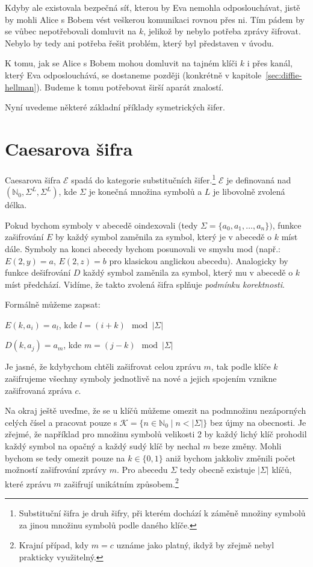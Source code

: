 \documentclass[
  program=infoi,
  biblatex,
  figures=false,
  glossaries,
  index
]{kidiplom}
\begin{document}
    Kdyby ale existovala bezpečná síť, kterou by Eva nemohla
    odposlouchávat, jistě by mohli Alice s Bobem vést veškerou komunikaci rovnou přes ni.
    Tím pádem by se vůbec nepotřebovali domluvit na $k$, jelikož
    by nebylo potřeba zprávy šifrovat. Nebylo by tedy ani potřeba řešit problém, který byl představen v úvodu.

    K tomu, jak se Alice s Bobem mohou domluvit na tajném klíči $k$ i přes kanál, který 
    Eva odposlouchává, se dostaneme později (konkrétně v kapitole~\ref{sec:diffie-hellman}).
    Budeme k tomu potřebovat širší aparát znalostí.

    Nyní uvedeme některé základní příklady symetrických šifer.


\section{Caesarova šifra}

    Caesarova šifra $\mathcal{E}$ spadá do kategorie substitučních šifer.\footnote{Substituční šifra je druh šifry, při kterém dochází k záměně
    množiny symbolů za jinou množinu symbolů podle daného klíče.}
    $\mathcal{E}$ je definovaná nad $(\mathbb{N}_0,\Sigma^L,\Sigma^L)$, kde $\Sigma$
    je konečná množina symbolů a $L$ je libovolně zvolená délka.

    Pokud bychom symboly v abecedě oindexovali (tedy $\Sigma = \{a_0, a_1, \ldots, a_n\})$, funkce zašifrování $E$ by každý symbol zaměnila za
    symbol, který je v abecedě o $k$ míst dále. Symboly na konci abecedy bychom posunovali ve smyslu mod
    (např.: $E(2, y)= a$, $E(2, z)= b$ pro klasickou anglickou abecedu). Analogicky by 
    funkce dešifrování $D$ každý symbol zaměnila za symbol, který mu v abecedě o $k$ míst předchází.
    Vidíme, že takto zvolená šifra splňuje \emph{podmínku korektnosti}.

    \medskip

    Formálně můžeme zapsat:

    \begin{center}
        $E(k, a_i) = a_l$, kde $l = (i+k)\mod{|\Sigma|}$

        $D(k, a_j) = a_m$, kde $m = (j-k)\mod{|\Sigma|}$
    \end{center}

    Je jasné, že kdybychom chtěli zašifrovat celou zprávu $m$, tak podle klíče $k$ zašifrujeme všechny symboly jednotlivě na nové a
    jejich spojením vznikne zašifrovaná zpráva $c$.
    
    \bigskip
    Na okraj ještě uveďme, že se u klíčů můžeme omezit na podmnožinu nezáporných celých čísel a pracovat pouze s
    $\mathcal{K} =\{n \in \mathbb{N}_0 \mid n < |\Sigma|\}$
    bez újmy na obecnosti. Je zřejmé, že například pro množinu symbolů velikosti 2 by každý lichý klíč prohodil
    každý symbol na opačný a každý sudý klíč by nechal $m$ beze změny. Mohli bychom se tedy omezit pouze na $k \in \{0,1\}$
    aniž bychom jakkoliv změnili počet možností zašifrování zprávy $m$.
    Pro abecedu $\Sigma$ tedy obecně existuje $|\Sigma|$ klíčů, které zprávu $m$ zašifrují unikátním způsobem.\footnote{Krajní případ, kdy $m = c$
    uznáme jako platný, ikdyž by zřejmě nebyl prakticky využitelný.}
\end{document}
